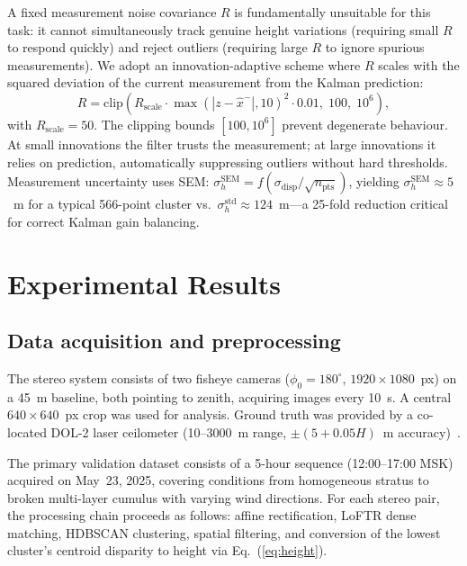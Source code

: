 \documentclass[preprint,
superscriptaddress,
amsmath,amssymb,aps,
twoside,final,secnumarabic,
nofootinbib]{revtex4-2}
\begin{document}
A fixed measurement noise covariance $R$ is fundamentally unsuitable for this task: it cannot simultaneously track genuine height variations (requiring small $R$ to respond quickly) and reject outliers (requiring large $R$ to ignore spurious measurements). We adopt an innovation-adaptive scheme where $R$ scales with the squared deviation of the current measurement from the Kalman prediction:
\begin{equation}
R = \text{clip}\left(R_\text{scale} \cdot \max(|z - \hat{x}^-|, 10)^2 \cdot 0.01,\; 100,\; 10^6\right),
\label{eq:adaptive}
\end{equation}
with $R_\text{scale} = 50$. The clipping bounds $[100, 10^6]$ prevent degenerate behaviour. At small innovations the filter trusts the measurement; at large innovations it relies on prediction, automatically suppressing outliers without hard thresholds. Measurement uncertainty uses SEM: $\sigma_h^{\text{SEM}} = f(\sigma_\text{disp} / \sqrt{n_\text{pts}})$, yielding $\sigma_h^{\text{SEM}} \approx 5$~m for a typical 566-point cluster vs.\ $\sigma_h^{\text{std}} \approx 124$~m---a 25-fold reduction critical for correct Kalman gain balancing.

\section{Experimental Results}\label{sec:results}

\subsection{Data acquisition and preprocessing}

The stereo system consists of two fisheye cameras ($\phi_0 = 180^\circ$, $1920 \times 1080$~px) on a 45~m baseline, both pointing to zenith, acquiring images every 10~s. A central $640 \times 640$~px crop was used for analysis. Ground truth was provided by a co-located DOL-2 laser ceilometer (10--3000~m range, $\pm(5 + 0.05H)$~m accuracy)~\cite{6}.

The primary validation dataset consists of a 5-hour sequence (12:00--17:00 MSK) acquired on May~23, 2025, covering conditions from homogeneous stratus to broken multi-layer cumulus with varying wind directions. For each stereo pair, the processing chain proceeds as follows: affine rectification, LoFTR dense matching, HDBSCAN clustering, spatial filtering, and conversion of the lowest cluster's centroid disparity to height via Eq.~(\ref{eq:height}).
\end{document}
